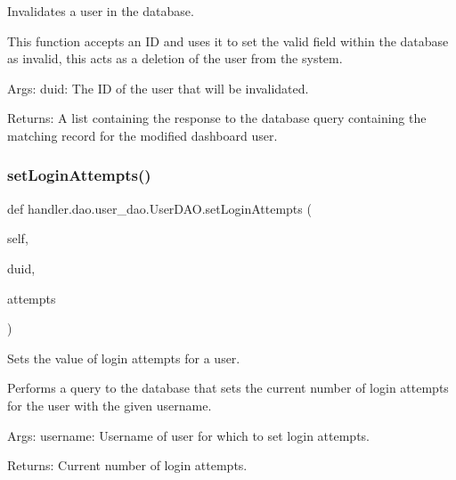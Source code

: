 \begin{DoxyVerb}Invalidates a user in the database.

This function accepts an ID and uses it to set the valid field
within the database as invalid, this acts as a deletion of the user
from the system.

Args:
    duid: The ID of the user that will be invalidated.

Returns:
    A list containing the response to the database query
    containing the matching record for the modified dashboard user.
\end{DoxyVerb}
 \mbox{\label{classhandler_1_1dao_1_1user__dao_1_1_user_d_a_o_aec0187ac1e8c477a072a45b040edde2a}} 
\subsubsection{\texorpdfstring{set\+Login\+Attempts()}{setLoginAttempts()}}
{\footnotesize\ttfamily def handler.\+dao.\+user\+\_\+dao.\+User\+D\+A\+O.\+set\+Login\+Attempts (\begin{DoxyParamCaption}\item[{}]{self,  }\item[{}]{duid,  }\item[{}]{attempts }\end{DoxyParamCaption})}

\begin{DoxyVerb}Sets the value of login attempts for a user.

Performs a query to the database that sets the current number 
of login attempts for the user with the given username.

Args:
    username: Username of user for which to set login attempts.

Returns:
    Current number of login attempts.
\end{DoxyVerb}
 \mbox{\label{classhandler_1_1dao_1_1user__dao_1_1_user_d_a_o_a95abcb468f166ca40e8624e926c0f650}} 
